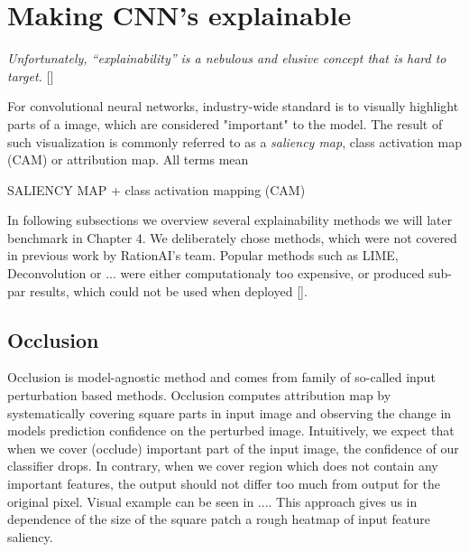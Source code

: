 
\section{Making CNN's explainable}

\emph{Unfortunately, “explainability” is a nebulous and elusive concept that is hard to target.} []
\newline



For convolutional neural networks, industry-wide standard is to visually highlight parts of a image, which are considered "important" to the model. The result of such visualization is commonly referred to as a \emph{saliency map}, class activation map (CAM) or attribution map. All terms mean 

SALIENCY MAP + class activation mapping (CAM)

\noindent
In following subsections we overview several explainability methods we will later benchmark in Chapter 4. We deliberately chose methods, which were not covered in previous work by RationAI's team. Popular methods such as LIME, Deconvolution or ...  were either computationaly too expensive, or produced sub-par results, which could not be used when deployed [].



\subsection{Occlusion}

Occlusion is model-agnostic method and comes from family of so-called input perturbation based methods. Occlusion computes attribution map by systematically covering square parts in input image and observing the change in models prediction confidence on the perturbed image. Intuitively, we expect that when we cover (occlude) important part of the input image, the confidence of our classifier drops. In contrary, when we cover region which does not contain any important features, the output should not differ too much from output for the original pixel. Visual example can be seen in .... This approach gives us in dependence of the size of the square patch a rough heatmap of input feature saliency.

